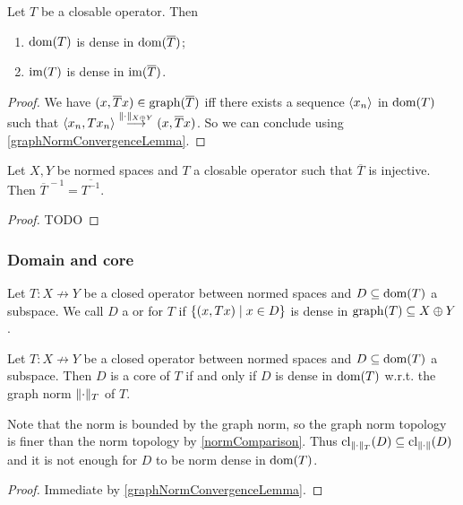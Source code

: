 \begin{lemma} \label{domImClosureOperator}
Let $T$ be a closable operator. Then
\begin{enumerate}
\item $\operatorname{dom}(T)$ is dense in $\operatorname{dom}(\overline{T})$;
\item $\operatorname{im}(T)$ is dense in $\operatorname{im}(\overline{T})$.
\end{enumerate}
\end{lemma}
\begin{proof}
We have $(x,\overline{T}x)\in\operatorname{graph}(\overline{T})$ iff there exists a sequence $\left\langle x_n \right\rangle$ in $\operatorname{dom}(T)$ such that $\left\langle x_n,Tx_n \right\rangle\overset{\lVert\cdot\rVert_{X\oplus Y}}{\longrightarrow} (x,\overline{T}x)$. So we can conclude using \ref{graphNormConvergenceLemma}.
\end{proof}

\begin{lemma}
Let $X,Y$ be normed spaces and $T$ a closable operator such that $\overline{T}$ is injective. Then $\overline{T}^{\,-1} = \overline{T^{-1}}$.
\end{lemma}
\begin{proof}
TODO
\end{proof}

\subsubsection{Domain and core}
\begin{definition}
Let $T: X\not\to Y$ be a closed operator between normed spaces and $D\subseteq \operatorname{dom}(T)$ a subspace. We call $D$ a  or  for $T$ if $\setbuilder{(x,Tx)}{x\in D}$ is dense in $\operatorname{graph}(T)\subseteq X\oplus Y$.
\end{definition}

\begin{proposition} \label{operatorCoreCriterion}
Let $T: X\not\to Y$ be a closed operator between normed spaces and $D\subseteq \operatorname{dom}(T)$ a subspace. Then $D$ is a core of $T$ \textup{if and only if} $D$ is dense in $\operatorname{dom}(T)$ w.r.t. the graph norm $\lVert\cdot\rVert_T$ of $T$.
\end{proposition}
Note that the norm is bounded by the graph norm, so the graph norm topology is finer than the norm topology by \ref{normComparison}. Thus $\operatorname{cl}_{\lVert\cdot\rVert_T}(D) \subseteq \operatorname{cl}_{\lVert\cdot\rVert}(D)$ and it is not enough for $D$ to be norm dense in $\operatorname{dom}(T)$.
\begin{proof}
Immediate by \ref{graphNormConvergenceLemma}.
\end{proof}

